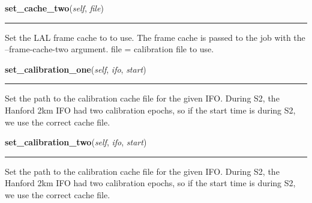     \label{stochastic:StochasticNode:set_cache_two}
    \vspace{0.5ex}

    \begin{boxedminipage}{\textwidth}

    \raggedright \textbf{set\_cache\_two}(\textit{self}, \textit{file})

    \vspace{-1.5ex}

    \rule{\textwidth}{0.5\fboxrule}
    Set the LAL frame cache to to use. The frame cache is passed to the 
    job with the --frame-cache-two argument. file = calibration file to 
    use.

    \vspace{1ex}

    \end{boxedminipage}

    \label{stochastic:StochasticNode:set_calibration_one}
    \vspace{0.5ex}

    \begin{boxedminipage}{\textwidth}

    \raggedright \textbf{set\_calibration\_one}(\textit{self}, \textit{ifo}, \textit{start})

    \vspace{-1.5ex}

    \rule{\textwidth}{0.5\fboxrule}
    Set the path to the calibration cache file for the given IFO. During 
    S2, the Hanford 2km IFO had two calibration epochs, so if the start 
    time is during S2, we use the correct cache file.

    \vspace{1ex}

    \end{boxedminipage}

    \label{stochastic:StochasticNode:set_calibration_two}
    \vspace{0.5ex}

    \begin{boxedminipage}{\textwidth}

    \raggedright \textbf{set\_calibration\_two}(\textit{self}, \textit{ifo}, \textit{start})

    \vspace{-1.5ex}

    \rule{\textwidth}{0.5\fboxrule}
    Set the path to the calibration cache file for the given IFO. During 
    S2, the Hanford 2km IFO had two calibration epochs, so if the start 
    time is during S2, we use the correct cache file.

    \vspace{1ex}

    \end{boxedminipage}

